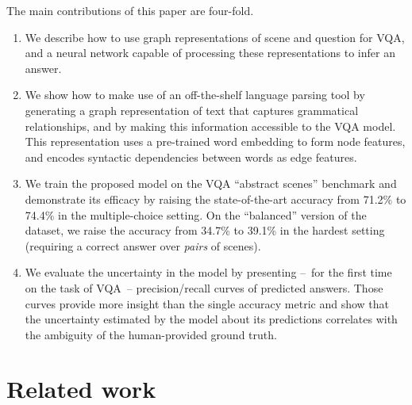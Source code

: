 \vspace{1ex}
\noindent
The main contributions of this paper are four-fold.
\begin{enumerate}[topsep=2pt,itemsep=-1ex,partopsep=1ex,parsep=1ex,label={\arabic*)},leftmargin=3.0ex]
\item We describe how to use graph representations of scene and question for VQA, and a neural network capable of processing these representations to infer an answer.
\item We show how to make use of an off-the-shelf language parsing tool by generating a graph representation of text that captures grammatical relationships, and by making this information accessible to the VQA model. This representation uses a pre-trained word embedding to form node features, and encodes syntactic dependencies between words as edge features.
\item We train the proposed model on the VQA ``abstract scenes'' benchmark \cite{antol2015vqa} and demonstrate its efficacy by raising the state-of-the-art accuracy from 71.2\% to 74.4\% in the multiple-choice setting. On the ``balanced'' version of the dataset, we raise the accuracy from 34.7\% to 39.1\% in the hardest setting (requiring a correct answer over \textit{pairs} of scenes).
\item We evaluate the uncertainty in the model by presenting --~for the first time on the task of VQA~-- precision/recall curves of predicted answers. Those curves provide more insight than the single accuracy metric and show that the uncertainty estimated by the model about its predictions correlates with the ambiguity of the human-provided ground truth.
\end{enumerate}

\section{Related work}

